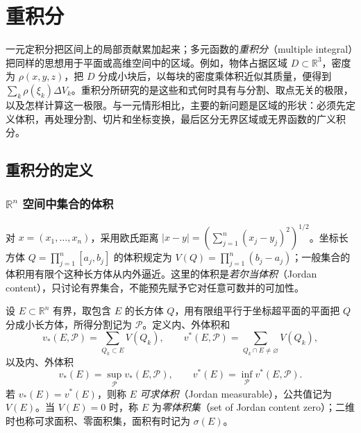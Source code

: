 \setcounter{chapter}{14} %
\chapter{重积分}
\label{chap:multiple-integrals}

一元定积分把区间上的局部贡献累加起来；多元函数的\emph{重积分}（multiple integral）把同样的思想用于平面或高维空间中的区域。例如，物体占据区域 $D\subset\mathbb R^3$，密度为 $\rho(x,y,z)$，把 $D$ 分成小块后，以每块的密度乘体积近似其质量，便得到 $\sum_k\rho(\xi_k)\Delta V_k$。重积分所研究的是这些和式何时具有与分割、取点无关的极限，以及怎样计算这一极限。与一元情形相比，主要的新问题是区域的形状：必须先定义体积，再处理分割、切片和坐标变换，最后区分无界区域或无界函数的广义积分。


\section{重积分的定义}
\label{sec:definition-of-multiple-integrals}

\subsection{\texorpdfstring{$\mathbb{R}^n$}{R^n} 空间中集合的体积}
\label{subsec:volumes-of-sets-in-euclidean-space}

对 $x=(x_1,\ldots,x_n)$，采用欧氏距离 $|x-y|=(\sum_{j=1}^n(x_j-y_j)^2)^{1/2}$。坐标长方体 $Q=\prod_{j=1}^n[a_j,b_j]$ 的体积规定为 $V(Q)=\prod_{j=1}^n(b_j-a_j)$；一般集合的体积用有限个这种长方体从内外逼近。这里的体积是\emph{若尔当体积}（Jordan content），只讨论有界集合，不能预先赋予它对任意可数并的可加性。

\begin{definition}
\label{def:multiple-jordan-volume}
设 $E\subset\mathbb R^n$ 有界，取包含 $E$ 的长方体 $Q$，用有限组平行于坐标超平面的平面把 $Q$ 分成小长方体，所得分割记为 $\mathcal P$。定义内、外体积和
\[
    v_*(E,\mathcal P)=\sum_{Q_k\subset E}V(Q_k),\qquad
    v^*(E,\mathcal P)=\sum_{Q_k\cap E\ne\varnothing}V(Q_k),
\]
以及内、外体积
\[
    v_*(E)=\sup_{\mathcal P}v_*(E,\mathcal P),\qquad
    v^*(E)=\inf_{\mathcal P}v^*(E,\mathcal P).
\]
若 $v_*(E)=v^*(E)$，则称 $E$ \emph{可求体积}（Jordan measurable），公共值记为 $V(E)$。当 $V(E)=0$ 时，称 $E$ 为\emph{零体积集}（set of Jordan content zero）；二维时也称可求面积、零面积集，面积有时记为 $\sigma(E)$。
\end{definition}

